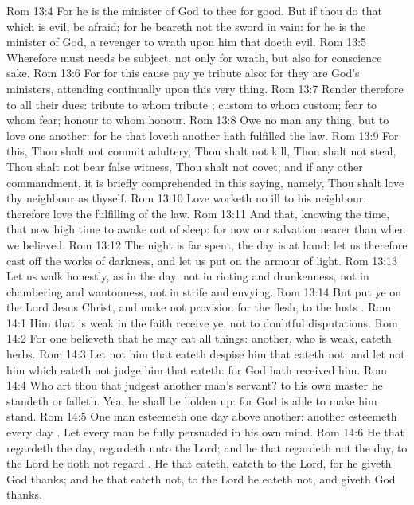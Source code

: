 \vs Rom 13:4 For he is the minister of God to thee for good. But if thou do that which is evil, be afraid; for he beareth not the sword in vain: for he is the minister of God, a revenger to  wrath upon him that doeth evil.
\vs Rom 13:5 Wherefore  must needs be subject, not only for wrath, but also for conscience sake.
\vs Rom 13:6 For for this cause pay ye tribute also: for they are God's ministers, attending continually upon this very thing.
\vs Rom 13:7 Render therefore to all their dues: tribute to whom tribute ; custom to whom custom; fear to whom fear; honour to whom honour.
\vs Rom 13:8 Owe no man any thing, but to love one another: for he that loveth another hath fulfilled the law.
\vs Rom 13:9 For this, Thou shalt not commit adultery, Thou shalt not kill, Thou shalt not steal, Thou shalt not bear false witness, Thou shalt not covet; and if  any other commandment, it is briefly comprehended in this saying, namely, Thou shalt love thy neighbour as thyself.
\vs Rom 13:10 Love worketh no ill to his neighbour: therefore love  the fulfilling of the law.
\vs Rom 13:11 And that, knowing the time, that now  high time to awake out of sleep: for now  our salvation nearer than when we believed.
\vs Rom 13:12 The night is far spent, the day is at hand: let us therefore cast off the works of darkness, and let us put on the armour of light.
\vs Rom 13:13 Let us walk honestly, as in the day; not in rioting and drunkenness, not in chambering and wantonness, not in strife and envying.
\vs Rom 13:14 But put ye on the Lord Jesus Christ, and make not provision for the flesh, to  the lusts .
\vs Rom 14:1 Him that is weak in the faith receive ye,  not to doubtful disputations.
\vs Rom 14:2 For one believeth that he may eat all things: another, who is weak, eateth herbs.
\vs Rom 14:3 Let not him that eateth despise him that eateth not; and let not him which eateth not judge him that eateth: for God hath received him.
\vs Rom 14:4 Who art thou that judgest another man's servant? to his own master he standeth or falleth. Yea, he shall be holden up: for God is able to make him stand.
\vs Rom 14:5 One man esteemeth one day above another: another esteemeth every day . Let every man be fully persuaded in his own mind.
\vs Rom 14:6 He that regardeth the day, regardeth  unto the Lord; and he that regardeth not the day, to the Lord he doth not regard . He that eateth, eateth to the Lord, for he giveth God thanks; and he that eateth not, to the Lord he eateth not, and giveth God thanks.
